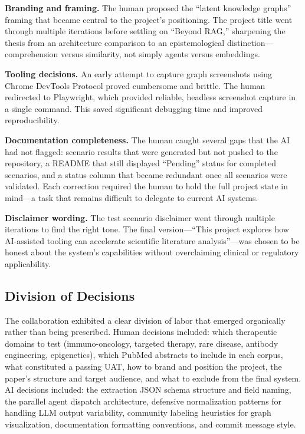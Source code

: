 \textbf{Branding and framing.} The human proposed the ``latent knowledge graphs'' framing that became central to the project's positioning. The project title went through multiple iterations before settling on ``Beyond RAG,'' sharpening the thesis from an architecture comparison to an epistemological distinction---comprehension versus similarity, not simply agents versus embeddings.

\textbf{Tooling decisions.} An early attempt to capture graph screenshots using Chrome DevTools Protocol proved cumbersome and brittle. The human redirected to Playwright, which provided reliable, headless screenshot capture in a single command. This saved significant debugging time and improved reproducibility.

\textbf{Documentation completeness.} The human caught several gaps that the AI had not flagged: scenario results that were generated but not pushed to the repository, a README that still displayed ``Pending'' status for completed scenarios, and a status column that became redundant once all scenarios were validated. Each correction required the human to hold the full project state in mind---a task that remains difficult to delegate to current AI systems.

\textbf{Disclaimer wording.} The test scenario disclaimer went through multiple iterations to find the right tone. The final version---``This project explores how AI-assisted tooling can accelerate scientific literature analysis''---was chosen to be honest about the system's capabilities without overclaiming clinical or regulatory applicability.

\subsection{Division of Decisions}

The collaboration exhibited a clear division of labor that emerged organically rather than being prescribed. Human decisions included: which therapeutic domains to test (immuno-oncology, targeted therapy, rare disease, antibody engineering, epigenetics), which PubMed abstracts to include in each corpus, what constituted a passing UAT, how to brand and position the project, the paper's structure and target audience, and what to exclude from the final system. AI decisions included: the extraction JSON schema structure and field naming, the parallel agent dispatch architecture, defensive normalization patterns for handling LLM output variability, community labeling heuristics for graph visualization, documentation formatting conventions, and commit message style.

